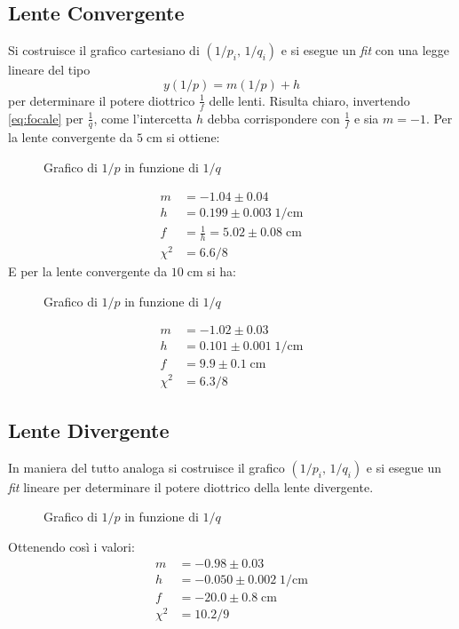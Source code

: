 \documentclass{article}[a4paper,11pt]
\begin{document}
\subsection*{Lente Convergente}
Si costruisce il grafico cartesiano di $(1/p_i  ,\,  1/q_i)$ e si esegue un \emph{fit} con una legge lineare del tipo \begin{equation}\label{eq:fit}
y(1/p) = m(1/p) + h
\end{equation}
per determinare il potere diottrico $\frac{1}{f}$ delle lenti. Risulta chiaro, invertendo \eqref{eq:focale} per $\frac{1}{q}$, come l'intercetta $h$ debba corrispondere con $\frac{1}{f}$ e sia $m=-1$.
Per la lente convergente da $5 \; \si{\cm}$ si ottiene:
\begin{figure}[!htb]
	\centering
		\scalebox{0.8}{}
	\caption{Grafico di $1/p$ in funzione di $1/q$ \label{graph: conv5}}
\end{figure}
\begin{align*}
m &= -1.04 \pm 0.04 \\
h &= 0.199 \pm 0.003 \; \si{1/\cm} \\
f &= \frac{1}{h} = 5.02 \pm 0.08 \; \si{\cm} \\
\chi^2 &= 6.6/8
\end{align*}
E per la lente convergente da $10 \; \si{\cm}$ si ha:
\begin{figure}[!htb]
	\centering
		\scalebox{0.8}{}
	\caption{Grafico di $1/p$ in funzione di $1/q$ \label{graph: conv10}}
\end{figure}
\begin{align*}
m &= -1.02 \pm 0.03 \\
h &= 0.101 \pm 0.001 \; \si{1/\cm} \\
f &= 9.9 \pm 0.1 \; \si{\cm} \\
\chi^2 &= 6.3/8
\end{align*}
\subsection*{Lente Divergente}
In maniera del tutto analoga si costruisce il grafico $(1/p_i  ,\,  1/q_i)$ e si esegue un \emph{fit} lineare per determinare il potere diottrico della lente divergente.
\begin{figure}[!htb]
	\centering
		\scalebox{0.8}{}
	\caption{Grafico di $1/p$ in funzione di $1/q$ \label{graph: div}}
\end{figure}
Ottenendo così i valori:
\begin{align*}
m &= -0.98 \pm 0.03 \\
h &= -0.050 \pm 0.002 \; \si{1/\cm} \\
f &= -20.0 \pm 0.8 \; \si{\cm} \\
\chi^2 &= 10.2/9
\end{align*}
\end{document}

